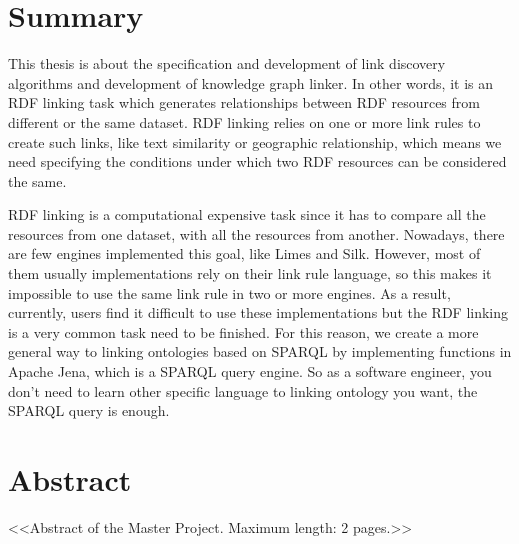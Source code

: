 \chapter*{Summary}

\par This thesis is about the specification and development of link discovery algorithms and development of knowledge graph linker. In other words, it is an RDF linking task which generates relationships between RDF resources from different or the same dataset. RDF linking relies on one or more link rules to create such links, like text similarity or geographic relationship, which means we need specifying the conditions under which two RDF resources can be considered the same. 

\par RDF linking is a computational expensive task since it has to compare all the resources from one dataset, with all the resources from another. Nowadays, there are few engines implemented this goal, like Limes and Silk. However, most of them usually implementations rely on their link rule language, so this makes it impossible to use the same link rule in two or more engines. As a result, currently, users find it difficult to use these implementations but the RDF linking is a very common task need to be finished. For this reason, we create a more general way to linking ontologies based on SPARQL by implementing functions in Apache Jena, which is a SPARQL query engine. So as a software engineer, you don't need to learn other specific language to linking ontology you want, the SPARQL query is enough.


\newpage

\chapter*{Abstract}

<<Abstract of the Master Project. Maximum length: 2 pages.>>


